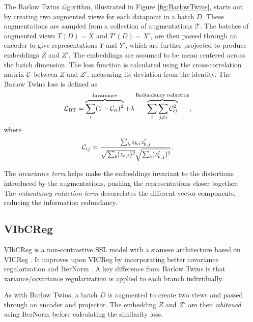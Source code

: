 \documentclass[../../thesis.tex]{subfiles}
\begin{document}
The Barlow Twins algorithm, illustrated in Figure \ref{fig:BarlowTwins}, starts out by creating two augmented views for each datapoint in a batch $D$. These augmentations are sampled from a collection of augmentations $\mathcal{T}$. The batches of augmented views $T(D) = X$ and $T'(D) =X'$, are then passed through an encoder to give representations $Y$ and $Y'$, which are further projected to produce embeddings $Z$ and $Z'$. The embeddings are assumed to be mean centered across the batch dimension. The loss function is calculated using the cross-correlation matrix $\mathcal{C}$ between $Z$ and $Z'$, measuring its deviation from the identity. The Barlow Twins loss is defined as
\begin{equation}
    \label{eq:BTLoss}
    \mathcal{L}_{\text{BT}} = 
    \overbrace{\sum_i (1 - \mathcal{C}_{ii})^2}^{\text{Invariance}}
    +\lambda  \overbrace{\sum_i\sum_{j\neq i} \mathcal{C}_{ij}^2}^{\text{Redundancy reduction}},
\end{equation}
where
\begin{equation}
    \mathcal{C}_{ij} = \frac{\sum_b z_{b,i}z_{b,j}'}{\sqrt{\sum_b (z_{b,i})^2}\sqrt{\sum_b (z_{b,j}')^2}}.
\end{equation}

The \textit{invariance term} helps make the embeddings invariant to the distortions introduced by the augmentations, pushing the representations closer together. The \textit{redundancy reduction term} decorrelates the different vector components, reducing the information redundancy.\newline

\subsection{VIbCReg}

VIbCReg \cite{lee2024computer} is a non-contrastive SSL model with a siamese architecture based on VICReg \cite{bardes2022vicreg}. It improves upon VICReg by incorporating better covariance regularization and IterNorm \cite{huang2019iterative}. A key difference from Barlow Twins is that variance/covariance regularization is applied to each branch individually.\newline

As with Barlow Twins, a batch $D$ is augmented to create two views and passed through an encoder and projector. The embedding $Z$ and $Z'$ are then \textit{whitened} using IterNorm \cite{huang2019iterative} before calculating the similarity loss.\newline
\end{document}
